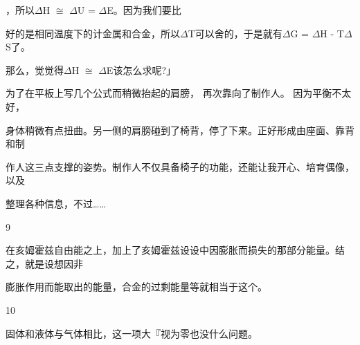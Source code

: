 ，所以$\Delta$H $\cong$ $\Delta$U = $\Delta$E。因为我们要比\par
好的是相同温度下的计金属和合金，所以$\Delta$T可以舍的，于是就有$\Delta$G = $\Delta$H - T$\Delta$S了。\par
那么，觉觉得$\Delta$H $\cong$ $\Delta$E该怎么求呢?」\par
为了在平板上写几个公式而稍微抬起的肩膀， 再次靠向了制作人。 因为平衡不太好，\par
身体稍微有点扭曲。另一侧的肩膀碰到了椅背，停了下来。正好形成由座面、靠背和制\par
作人这三点支撑的姿势。制作人不仅具备椅子的功能，还能让我开心、培育偶像，以及\par
整理各种信息，不过……\par
9\par
在亥姆霍兹自由能之上，加上了亥姆霍兹设设中因膨胀而损失的那部分能量。结之，就是设想因非\par
膨胀作用而能取出的能量，合金的过剩能量等就相当于这个。\par
10\par
固体和液体与气体相比，这一项大『视为零也没什么问题。\par

